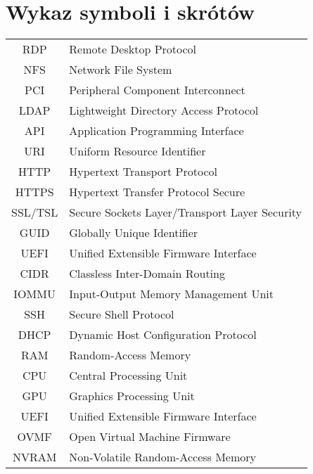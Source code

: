 \documentclass[a4paper,11pt,twoside]{report}
\begin{document}



\thispagestyle{empty}


\chapter*{Wykaz symboli i skrótów}

\begin{tabular}{cl}
  RDP     & Remote Desktop Protocol                       \\
  NFS     & Network File System                           \\
  PCI     & Peripheral Component Interconnect             \\
  LDAP    & Lightweight Directory Access Protocol         \\
  API     & Application Programming Interface             \\
  URI     & Uniform Resource Identifier                   \\
  HTTP    & Hypertext Transport Protocol                  \\
  HTTPS   & Hypertext Transfer Protocol Secure            \\
  SSL/TSL & Secure Sockets Layer/Transport Layer Security \\
  GUID    & Globally Unique Identifier                    \\
  UEFI    & Unified Extensible Firmware Interface         \\
  CIDR    & Classless Inter-Domain Routing                \\
  IOMMU   & Input-Output Memory Management Unit           \\
  SSH     & Secure Shell Protocol                         \\
  DHCP    & Dynamic Host Configuration Protocol           \\
  RAM     & Random-Access Memory                          \\
  CPU     & Central Processing Unit                       \\
  GPU     & Graphics Processing Unit                      \\
  UEFI    & Unified Extensible Firmware Interface         \\
  OVMF    & Open Virtual Machine Firmware                 \\
  NVRAM   & Non-Volatile Random-Access Memory
\end{tabular}
\thispagestyle{empty}
\end{document}
